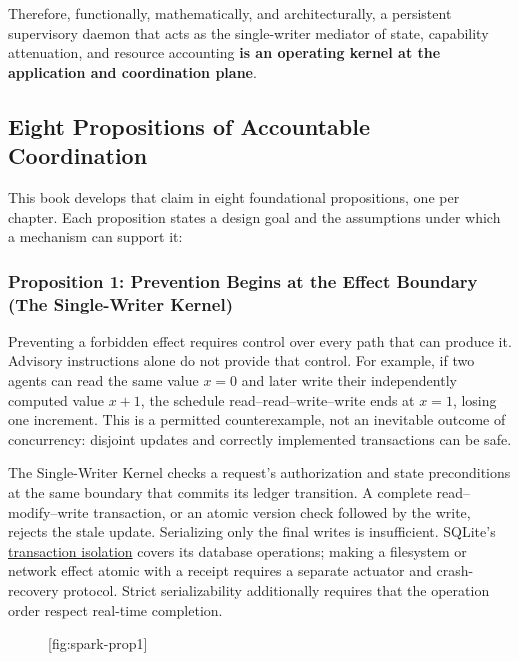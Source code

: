 \documentclass[11pt,a4paper]{article}
\providecommand{\pdchapref}[2]{\textbf{#2}}
\begin{document}
Therefore, functionally, mathematically, and architecturally, a persistent supervisory daemon that acts as the single-writer mediator of state, capability attenuation, and resource accounting \textbf{is an operating kernel at the application and coordination plane}.

\subsection{Eight Propositions of Accountable Coordination}

This book develops that claim in eight foundational propositions, one per chapter. Each proposition states a design goal and the assumptions under which a mechanism can support it:

\subsubsection*{Proposition 1: Prevention Begins at the Effect Boundary (\pdchapref{swk}{The Single-Writer Kernel})}
Preventing a forbidden effect requires control over every path that can produce it. Advisory instructions alone do not provide that control. For example, if two agents can read the same value $x=0$ and later write their independently computed value $x+1$, the schedule read--read--write--write ends at $x=1$, losing one increment. This is a permitted counterexample, not an inevitable outcome of concurrency: disjoint updates and correctly implemented transactions can be safe.

The Single-Writer Kernel checks a request's authorization and state preconditions at the same boundary that commits its ledger transition. A complete read--modify--write transaction, or an atomic version check followed by the write, rejects the stale update. Serializing only the final writes is insufficient. SQLite's \href{https://www.sqlite.org/isolation.html}{transaction isolation} covers its database operations; making a filesystem or network effect atomic with a receipt requires a separate actuator and crash-recovery protocol. Strict serializability additionally requires that the operation order respect real-time completion.

\begin{figure}[tp]
  \centering
  [fig:spark-prop1]
\end{figure}
\end{document}
